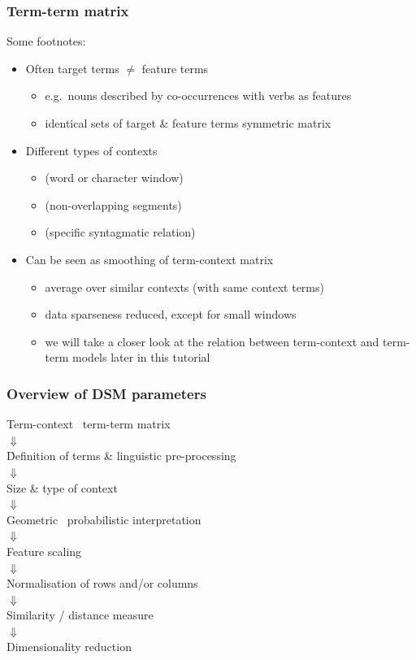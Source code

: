 \documentclass[t]{beamer} %
\begin{document}
\begin{frame}
  \frametitle{Term-term matrix}

  Some footnotes:
  \begin{itemize}
  \item Often target terms $\neq$ feature terms
    \begin{itemize}
    \item e.g.\ nouns described by co-occurrences with verbs as features
    \item identical sets of target \& feature terms \so symmetric matrix
    \end{itemize}
  \item Different types of contexts \citep{Evert:08}
    \begin{itemize}
    \item {} (word or character window)
    \item {} (non-overlapping segments)
    \item {} (specific syntagmatic relation)
    \end{itemize}
  \item Can be seen as smoothing of term-context matrix
    \begin{itemize}
    \item average over similar contexts (with same context terms)
    \item data sparseness reduced, except for small windows
    \item we will take a closer look at the relation between term-context and term-term models later in this tutorial
    \end{itemize}
  \end{itemize}

\end{frame}

\begin{frame}
  \frametitle{Overview of DSM parameters}

  \ungap[1]
  \begin{center}
    Term-context \vs\ term-term matrix\\
    $\Downarrow$\\
    \h{Definition of terms \& linguistic pre-processing}\\
    $\Downarrow$\\
    Size \& type of context\\
    $\Downarrow$\\
    Geometric \vs\ probabilistic interpretation\\
    $\Downarrow$\\
    Feature scaling\\
    $\Downarrow$\\
    Normalisation of rows and/or columns\\
    $\Downarrow$\\
    Similarity / distance measure\\
    $\Downarrow$\\
    Dimensionality reduction
  \end{center}
\end{frame}
\end{document}
